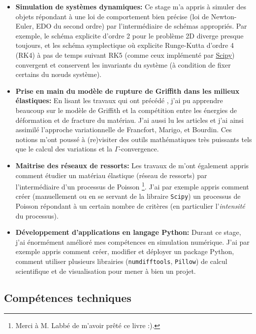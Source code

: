\begin{itemize}
    \item \textbf{Simulation de systèmes dynamiques:} Ce stage m'a appris à simuler des objets répondant à une loi de comportement bien précise (loi de Newton-Euler, EDO du second ordre) par l'intermédiaire de schémas appropriés. Par exemple, le schéma explicite d'ordre 2 pour le problème 2D diverge presque toujours, et les schéma symplectique où explicite Runge-Kutta d'ordre 4 (RK4) à pas de temps suivant RK5 (comme ceux implémenté par \href{https://docs.scipy.org/doc/scipy/reference/generated/scipy.integrate.solve_ivp.html}{Scipy}) convergent et conservent les invariants du système (à condition de fixer certains du n\oe{}uds système).
    \item \textbf{Prise en main du modèle de rupture de Griffith dans les milieux élastiques:} En lisant les travaux qui ont précédé \parencite{balasoiu2020halthesis}, j'ai pu apprendre beaucoup sur le modèle de Griffith et la compétition entre les énergies de déformation et de fracture du matériau. J'ai aussi lu les articles \parencite{francfort1998revisiting,bourdin2008variational} et j'ai ainsi assimilé l'approche variationnelle de Francfort, Marigo, et Bourdin. Ces notions m'ont poussé à (re)visiter des outils mathématiques très puissants tels que le calcul des variations et la $\Gamma$-convergence.
    \item \textbf{Maitrise des réseaux de ressorts:} Les travaux de \citeauthor{balasoiu2020halthesis} m'ont également appris comment étudier un matériau élastique (réseau de ressorts) par l'intermédiaire d'un processus de Poisson \parencite{khasminskii2011stochastic}\footnote{Merci à M. Labbé de m'avoir prêté ce livre :).}. J'ai par exemple appris comment créer (manuellement ou en se servant de la libraire \texttt{Scipy}) un processus de Poisson répondant à un certain nombre de critères (en particulier l'\emph{intensité} du processus).
    \item \textbf{Développement d'applications en langage Python:} Durant ce stage, j'ai énormément amélioré mes compétences en simulation numérique. J'ai par exemple appris comment créer, modifier et déployer un package Python, comment utiliser plusieurs librairies (\texttt{numdifftools}, \texttt{Pillow}) de calcul scientifique et de visualisation pour mener à bien un projet.
\end{itemize}




\subsection{Compétences techniques}

